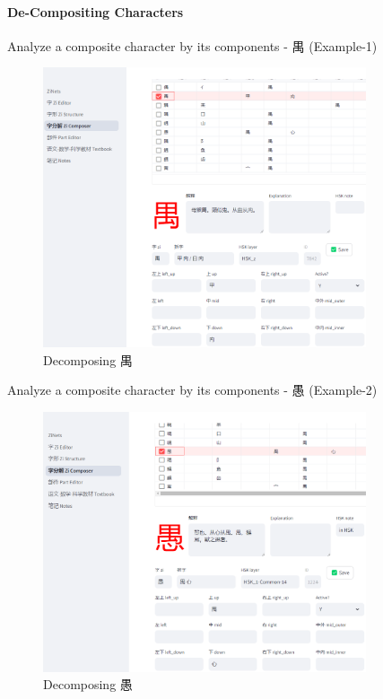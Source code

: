 \documentclass[
  11pt,
  letterpaper,
]{article}
\begin{document}
\paragraph{De-Compositing Characters}\label{de-compositing-characters}

Analyze a composite character by its components - 禺 (Example-1)

\begin{figure}
\centering
\includegraphics[width=0.85\textwidth]{./images/app_zi-parts_1.png}
\caption{Decomposing 禺}
\end{figure}

Analyze a composite character by its components - 愚 (Example-2)

\begin{figure}
\centering
\includegraphics[width=0.85\textwidth]{./images/app_zi-parts_2.png}
\caption{Decomposing 愚}
\end{figure}
\end{document}
